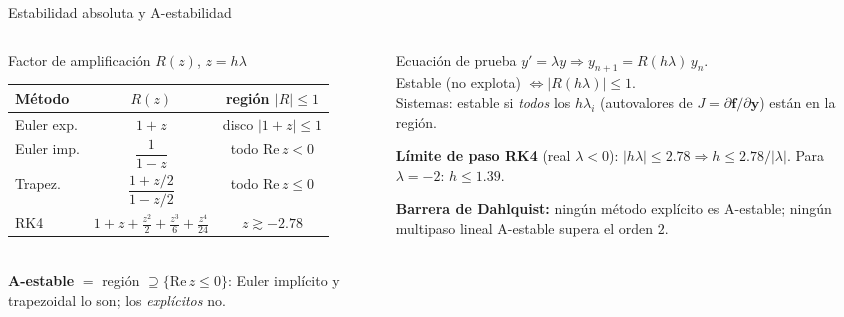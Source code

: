 \documentclass[aspectratio=169,10pt]{beamer}
\begin{document}
\begin{frame}{Estabilidad absoluta y A-estabilidad}
\begin{columns}[T]
\begin{column}{0.52\textwidth}
\begin{cardgear}{Factor de amplificación $R(z)$, $z=h\lambda$}{\faTable}
\centering
{\footnotesize\renewcommand{\arraystretch}{1.35}\setlength{\tabcolsep}{4pt}
\begin{tabular}{l|c|c}
Método & $R(z)$ & región $|R|\le1$\\\hline
Euler exp. & $1+z$ & disco $|1{+}z|\le1$\\
Euler imp. & $\dfrac{1}{1-z}$ & todo $\mathrm{Re}\,z<0$\\
Trapez. & $\dfrac{1+z/2}{1-z/2}$ & todo $\mathrm{Re}\,z\le0$\\
RK4 & $1{+}z{+}\tfrac{z^2}{2}{+}\tfrac{z^3}{6}{+}\tfrac{z^4}{24}$ & $z\gtrsim-2.78$\\
\end{tabular}}\\[1.2mm]
{\footnotesize \textbf{A-estable} $=$ región $\supseteq\{\mathrm{Re}\,z\le0\}$: Euler implícito y trapezoidal lo son; los \emph{explícitos} no.}
\end{cardgear}
\end{column}
\begin{column}{0.46\textwidth}
\begin{cardidea}{Ecuación de prueba}{\faSuperscript}
{\footnotesize $y'=\lambda y\Rightarrow y_{n+1}=R(h\lambda)\,y_n$.\\[0.3mm]
Estable (no explota) $\Leftrightarrow|R(h\lambda)|\le1$.\\[0.6mm]
Sistemas: estable si \emph{todos} los $h\lambda_i$ (autovalores de $J=\partial\mathbf f/\partial\mathbf y$) están en la región.}
\end{cardidea}
\vspace{1mm}
\begin{cardnota}[\faExclamationTriangle]
{\footnotesize \textbf{Límite de paso RK4} (real $\lambda<0$): $|h\lambda|\le2.78\Rightarrow h\le2.78/|\lambda|$. Para $\lambda=-2$: $h\le1.39$.}
\end{cardnota}
\vspace{1mm}
\begin{cardnota}[\faInfoCircle]
{\footnotesize \textbf{Barrera de Dahlquist:} ningún método explícito es A-estable; ningún multipaso lineal A-estable supera el orden $2$.}
\end{cardnota}
\end{column}
\end{columns}
\end{frame}
\end{document}
